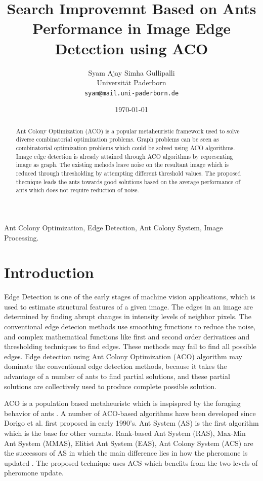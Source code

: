 \documentclass{llncs}
\title{Search Improvemnt Based on Ants Performance in Image Edge Detection using ACO}
\author{Syam Ajay Simha Gullipalli\\
		Universit\"at Paderborn\\
		\texttt{syam@mail.uni-paderborn.de}}
\date{\today}
\begin{document}
	\maketitle
	\thispagestyle{fancy}
	
	\begin{abstract}
	Ant Colony Optimization (ACO) is a popular metaheuristic framework used to solve diverse combinatorial optimization problems. Graph problems can be seen as combinatorial optimization problems which could be solved using ACO algorithms. Image edge detection is already attained through ACO algorithms by representing image as graph. The existing mehods leave noise on the resultant image which is reduced through thresholding by attempting different threshold values. The proposed thecnique leads the ants towards good solutions based on the average performance of ants which does not require reduction of noise.
	\end{abstract}
	
	\begin{keywords}
	Ant Colony Optimization, Edge Detection, Ant Colony System, Image Processing.
	\end{keywords}
	
	\section{Introduction} \label{sec:introduction}
	Edge Detection is one of the early stages of machine vision applications, which is used to estimate structural features of a given image. The edges in an image are determined by finding abrupt changes in intensity levels of neighbor pixels. The conventional edge detecion methods use smoothing functions to reduce the noise, and complex mathematical functions like first and second order derivatices and thresholding techniques to find edges. These methods may fail to find all possible edges. Edge detection using Ant Colony Optimization (ACO) algorithm may dominate the conventional edge detection methods, because it takes the advantage of a number of ants to find partial solutions, and these partial solutions are collectively used to produce complete possible solution. 
	
	ACO is a population based metaheuristc which is inspispred by the foraging behavior of ants \cite{Dorigo:2004, Dorigo:2007, Blum:2005}.  A number of ACO-based algorithms have been developed since Dorigo et al. first proposed in early 1990's. Ant System (AS) is the first algorithm which is the base for other varants. Rank-based Ant System (RAS), Max-Min Ant System (MMAS), Elitist Ant System (EAS), Ant Colony System (ACS) are the successors of AS in which the main difference lies in how the pheromone is updated \cite{Dorigo:2004, Dorigo:2007}. The proposed technique uses ACS which benefits from the two levels of pheromone update.
\end{document}
